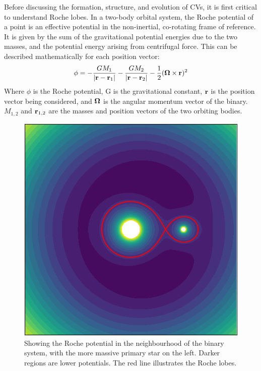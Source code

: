 Before discussing the formation, structure, and evolution of CVs, it is first critical to understand Roche lobes.
In a two-body orbital system, the Roche potential of a point is an effective potential in the non-inertial, co-rotating frame of reference. It is given by the sum of the gravitational potential energies due to the two masses, and the potential energy arising from centrifugal force. This can be described mathematically for each position vector:
\begin{equation}
    {\bf \phi} = -\frac{G M_1}{|{\bf r - r}_1|} - \frac{G M_2}{|{\bf r - r}_2|} - \frac{1}{2}({\bf \Omega} \times {\bf r})^2
\end{equation}
Where $\phi$ is the Roche potential, G is the gravitational constant, $\bf r$ is the position vector being considered, and $\bf \Omega$ is the angular momentum vector of the binary. $M_{1,2}$ and ${\bf r}_{1,2}$ are the masses and position vectors of the two orbiting bodies.

\begin{figure}
    \centering
    \includegraphics[width=.6\columnwidth]{figures/introduction/roche.png}
    \caption{Showing the Roche potential in the neighbourhood of the binary system, with the more massive primary star on the left. Darker regions are lower potentials. The red line illustrates the Roche lobes.}
    \label{fig:roche}
\end{figure}

